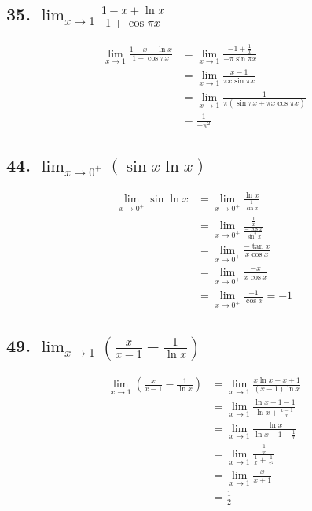 \documentclass{article}
\begin{document}
    \subsection*{35. $\lim_{x \to 1}\frac{1 - x + \ln x}{1 + \cos \pi x}$}

    $$\begin{aligned}
        \lim_{x \to 1}\frac{1 - x + \ln x}{1 + \cos \pi x} &= \lim_{x \to 1}\frac{-1 + \frac 1 x}{-\pi \sin \pi x} \\
        &= \lim_{x \to 1}\frac{x - 1}{\pi x \sin \pi x} \\
        &= \lim_{x \to 1}\frac{1}{\pi(\sin \pi x + \pi x \cos \pi x)} \\
        &= \frac{1}{-\pi ^2}
    \end{aligned}$$

    \subsection*{44. $\lim_{x \to 0^+}(\sin x \ln x)$}

    $$\begin{aligned}
        \lim_{x \to 0^+}\sin \ln x &= \lim_{x \to 0^+}\frac{\ln x}{\frac{1}{\sin x}} \\
        &= \lim_{x \to 0^+}\frac{\frac 1 x}{\frac{- \cos x}{\sin ^2 x}} \\
        &= \lim_{x \to 0^+}\frac{-\tan x}{x \cos x} \\
        &= \lim_{x \to 0^+}\frac{-x}{x \cos x} \\
        &= \lim_{x \to 0^+}\frac{-1}{\cos x} = -1
    \end{aligned}$$

    \subsection*{49. $\lim_{x \to 1}(\frac{x}{x - 1} - \frac{1}{\ln x})$}

    $$\begin{aligned}
        \lim_{x \to 1}(\frac{x}{x - 1} - \frac{1}{\ln x}) &= \lim_{x \to 1}\frac{x\ln x - x + 1}{(x - 1)\ln x} \\
        &= \lim_{x \to 1}\frac{\ln x + 1 - 1}{\ln x + \frac{x - 1}{x}} \\
        &= \lim_{x \to 1}\frac{\ln x}{\ln x + 1 - \frac 1 x} \\
        &= \lim_{x \to 1}\frac{\frac 1 x}{\frac 1 x + \frac{1}{x^2}} \\
        &= \lim_{x \to 1}\frac{x}{x + 1} \\
        &= \frac 1 2
    \end{aligned}$$
\end{document}
